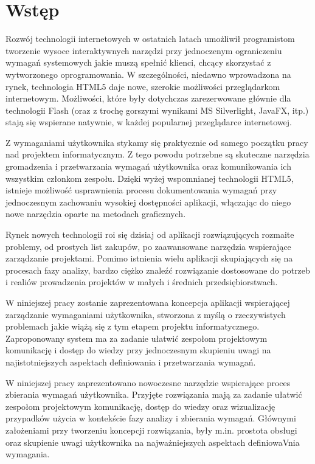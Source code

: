 \chapter{Wstęp}

    Rozwój technologii internetowych w ostatnich latach umożliwił programistom tworzenie wysoce interaktywnych narzędzi przy jednoczenym ograniczeniu wymagań systemowych jakie muszą spełnić klienci, chcący skorzystać z wytworzonego oprogramowania. W szczególności, niedawno wprowadzona na rynek, technologia HTML5 daje nowe, szerokie możliwości przeglądarkom internetowym. Możliwości, które były dotychczas zarezerwowane głównie dla technologii Flash (oraz z trochę gorszymi wynikami MS Silverlight, JavaFX, itp.) stają się wspierane natywnie, w każdej popularnej przeglądarce internetowej. 

    Z wymaganiami użytkownika stykamy się praktycznie od samego początku pracy nad projektem informatycznym. Z tego powodu potrzebne są skuteczne narzędzia gromadzenia i przetwarzania wymagań użytkownika oraz komunikowania ich wszystkim członkom zespołu. Dzięki wyżej wspomnianej technologii HTML5, istnieje możliwość usprawnienia procesu dokumentowania wymagań przy jednoczesnym zachowaniu wysokiej dostępności aplikacji, włączając do niego nowe narzędzia oparte na metodach graficznych. 

    Rynek nowych technologii roi się dzisiaj od aplikacji rozwiązujących rozmaite problemy, od prostych list zakupów, po zaawansowane narzędzia wspierające zarządzanie projektami. Pomimo istnienia wielu aplikacji skupiających się na procesach fazy analizy, bardzo ciężko znaleźć rozwiązanie dostosowane do potrzeb i realiów prowadzenia projektów w małych i średnich przedsiębiorstwach. 
          
    W niniejszej pracy zostanie zaprezentowana koncepcja aplikacji wspierającej zarządzanie wymaganiami użytkownika, stworzona z myślą o rzeczywistych problemach jakie wiążą się z tym etapem projektu informatycznego. Zaproponowany system ma za zadanie ułatwić zespołom projektowym komunikację i dostęp do wiedzy przy jednoczesnym skupieniu uwagi na najistotniejszych aspektach definiowania i przetwarzania wymagań. ~\cite{Leite87}

    W niniejszej pracy zaprezentowano nowoczesne narzędzie wspierające proces zbierania wymagań użytkownika. Przyjęte rozwiązania mają za zadanie ułatwić zespołom projektowym komunikację, dostęp do wiedzy oraz wizualizację przypadków użycia w kontekście fazy analizy i zbierania wymagań. Głównymi założeniami przy tworzeniu koncepcji rozwiązania, były m.in. prostota obsługi oraz skupienie uwagi użytkownika na najważniejszych aspektach definiowaVnia wymagania. 


